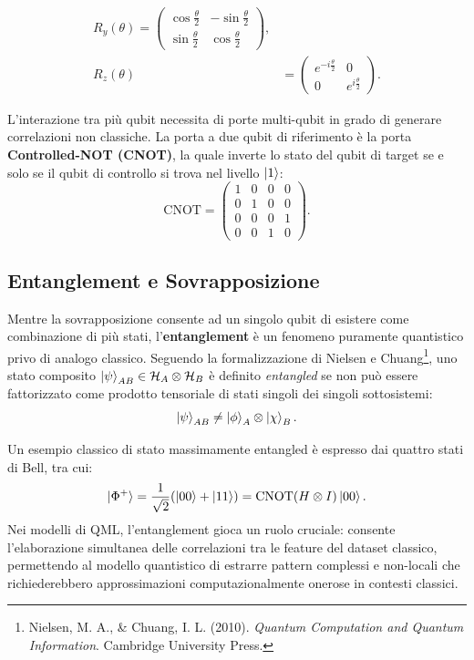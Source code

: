\begin{itemize}
\begin{align}
    R_y(\theta) = \begin{pmatrix} \cos\frac{\theta}{2} & -\sin\frac{\theta}{2} \\ \sin\frac{\theta}{2} & \cos\frac{\theta}{2} \end{pmatrix}, \\
    R_z(\theta) &= \begin{pmatrix} e^{-i\frac{\theta}{2}} & 0 \\ 0 & e^{i\frac{\theta}{2}} \end{pmatrix}.
    \end{align}
\end{itemize}

L'interazione tra più qubit necessita di porte multi-qubit in grado di generare correlazioni non classiche. La porta a due qubit di riferimento è la porta \textbf{Controlled-NOT (CNOT)}, la quale inverte lo stato del qubit di target se e solo se il qubit di controllo si trova nel livello $\ket{1}$:
\begin{equation}
\text{CNOT} = \begin{pmatrix}
1 & 0 & 0 & 0 \\
0 & 1 & 0 & 0 \\
0 & 0 & 0 & 1 \\
0 & 0 & 1 & 0
\end{pmatrix}.
\end{equation}

\subsection{Entanglement e Sovrapposizione}
Mentre la sovrapposizione consente ad un singolo qubit di esistere come combinazione di più stati, l'\textbf{entanglement} è un fenomeno puramente quantistico privo di analogo classico. Seguendo la formalizzazione di Nielsen e Chuang\footnote{Nielsen, M. A., \& Chuang, I. L. (2010). \textit{Quantum Computation and Quantum Information}. Cambridge University Press.}, uno stato composito $\ket{\psi}_{AB} \in \mathcal{H}_A \otimes \mathcal{H}_B$ è definito \textit{entangled} se non può essere fattorizzato come prodotto tensoriale di stati singoli dei singoli sottosistemi:
\begin{equation}
\ket{\psi}_{AB} \neq \ket{\phi}_A \otimes \ket{\chi}_B.
\end{equation}

Un esempio classico di stato massimamente entangled è espresso dai quattro stati di Bell, tra cui:
\begin{equation}
\ket{\Phi^+} = \frac{1}{\sqrt{2}}(\ket{00} + \ket{11}) = \text{CNOT} (H \otimes I) \ket{00}.
\end{equation}
Nei modelli di QML, l'entanglement gioca un ruolo cruciale: consente l'elaborazione simultanea delle correlazioni tra le feature del dataset classico, permettendo al modello quantistico di estrarre pattern complessi e non-locali che richiederebbero approssimazioni computazionalmente onerose in contesti classici.

